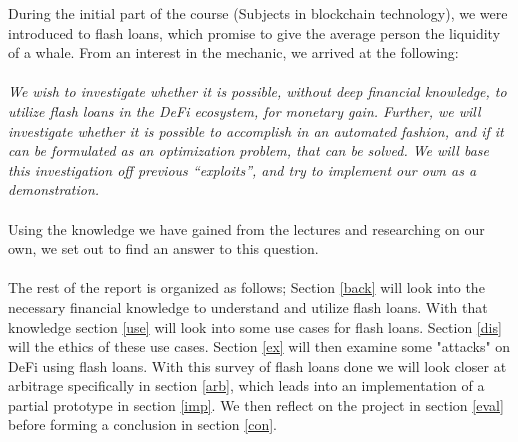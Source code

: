 During the initial part of the course (Subjects in blockchain technology), we
were introduced to flash loans, which promise to give the average person the
liquidity of a whale. From an interest in the mechanic, we arrived at the
following:\\\\
\textit{We wish to investigate whether it is possible, without deep financial
knowledge, to utilize flash loans in the DeFi ecosystem, for monetary
gain. Further, we will investigate whether it is possible to accomplish in
an automated fashion, and if it can be formulated as an optimization
problem, that can be solved. We will base this investigation off previous
``exploits'', and try to implement our own as a demonstration.}\\\\
Using the knowledge we have gained from the lectures and researching on our own,
we set out to find an answer to this question.\\\\
The rest of the report is organized as follows; Section \ref{back}
will look into the necessary financial knowledge to understand and utilize
flash loans. With that knowledge section \ref{use} will look into some
use cases for flash loans. Section \ref{dis} will the ethics of these use cases. Section \ref{ex} will then examine some
"attacks" on DeFi using flash loans. With this survey of flash loans
done we will look closer at arbitrage specifically in section
\ref{arb}, which leads into an implementation of a partial prototype in
section \ref{imp}. We then reflect on the project in section \ref{eval}
before forming a conclusion in section \ref{con}.
